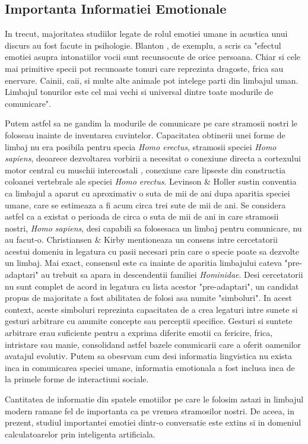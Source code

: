 \documentclass[a4paper,12pt, twoside]{book}
\begin{document}
			\subsection{Importanta Informatiei Emotionale}	
				In trecut, majoritatea studiilor legate de rolul emotiei umane in acustica 	unui discurs au fost facute in psihologie. Blanton \cite{blanton}, de exemplu, a scris ca "efectul emotiei asupra intonatiilor vocii sunt recunsocute de orice persoana. Chiar si cele mai primitive specii pot recunoaste tonuri care reprezinta dragoste, frica sau enervare. Cainii, caii, si multe alte animale pot intelege parti din limbajul uman. Limbajul tonurilor este cel mai vechi si universal dintre toate modurile de comunicare".\par 
				Putem astfel sa ne gandim la modurile de comunicare pe care stramosii nostri le foloseau inainte de inventarea cuvintelor. Capacitatea obtinerii unei forme de limbaj nu era posibila pentru specia \textit{Homo erectus}, stramosii speciei \textit{Homo sapiens}, deoarece dezvoltarea vorbirii a necesitat o conexiune directa a cortexului motor central cu muschii intercostali , conexiune care lipseste din constructia coloanei vertebrale ale speciei \textit{Homo erectus}. Levinson \& Holler \cite{leviholler} sustin conventia ca limbajul a aparut cu aproximativ o suta de mii de ani dupa aparitia speciei umane, care se estimeaza a fi acum circa trei sute de mii de ani. Se considera astfel ca a existat o perioada de circa o suta de mii de ani in care stramosii nostri, \textit{Homo sapiens}, desi capabili sa folosesaca un limbaj pentru comunicare, nu au facut-o. Christiansen \& Kirby \cite{chriskirbi} mentioneaza un consens intre cercetatorii acestui domeniu in legatura cu pasii necesari prin care o specie poate sa dezvolte un limbaj. Mai exact, consensul este ca inainte de aparitia limbajului cateva "pre-adaptari" au trebuit sa apara in descendentii familiei \textit{Hominidae}. Desi cercetatorii nu sunt complet de acord in legatura cu lista acestor "pre-adaptari", un candidat propus de majoritate a fost abilitatea de folosi asa numite "simboluri". In acest context, aceste simboluri reprezinta capacitatea de a crea legaturi intre sunete si gesturi arbitrare cu anumite concepte sau perceptii specifice. Gesturi si suntete arbitrare erau suficiente pentru a exprima diferite emotii ca fericire, frica, intristare sau manie, consolidand astfel bazele comunicarii care a oferit oamenilor avatajul evolutiv. Putem sa obesrvam cum desi informatia lingvistica nu exista inca in comunicarea speciei umane, informatia emotionala a fost inclusa inca de la primele forme de interactiuni sociale.\par 
				Cantitatea de informatie din spatele emotiilor pe care le folosim astazi in limbajul modern ramane fel de importanta ca pe vremea stramosilor nostri. De aceea, in prezent, studiul importantei emotiei dintr-o conversatie este extins si in domeniul calculatoarelor prin inteligenta artificiala. \par	
\end{document}

